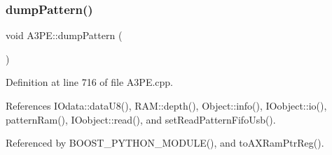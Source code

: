 \subsubsection{\texorpdfstring{dump\+Pattern()}{dumpPattern()}}
{\footnotesize\ttfamily void A3\+P\+E\+::dump\+Pattern (\begin{DoxyParamCaption}{ }\end{DoxyParamCaption})}



Definition at line 716 of file A3\+P\+E.\+cpp.



References I\+Odata\+::data\+U8(), R\+A\+M\+::depth(), Object\+::info(), I\+Oobject\+::io(), pattern\+Ram(), I\+Oobject\+::read(), and set\+Read\+Pattern\+Fifo\+Usb().



Referenced by B\+O\+O\+S\+T\+\_\+\+P\+Y\+T\+H\+O\+N\+\_\+\+M\+O\+D\+U\+L\+E(), and to\+A\+X\+Ram\+Ptr\+Reg().


